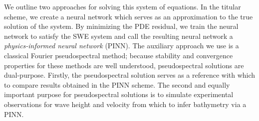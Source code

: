 We outline two approaches for solving this system of equations. In the titular scheme, we create a neural network which 
serves as an approximation to the true solution of the system. By minimizing the PDE residual, we train the neural 
network to satisfy the SWE system and call the resulting neural network a \textit{physics-informed neural network} 
(PINN). The auxiliary approach we use is a classical Fourier pseudospectral method; because 
stability and convergence properties for these methods are well understood, pseudospectral solutions are dual-purpose.
Firstly, the pseudospectral solution serves as a reference with which to compare results obtained in the PINN scheme. 
The second and equally important purpose for pseudospectral solutions is to simulate experimental observations for 
wave height and velocity from which to infer bathymetry via a PINN. 